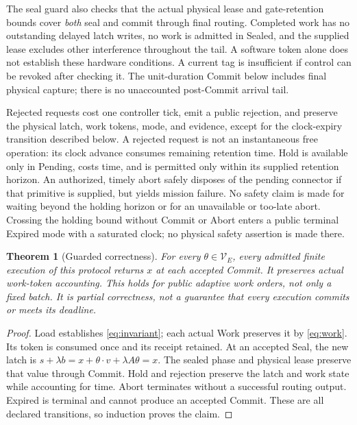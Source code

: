 \documentclass[11pt,a4paper]{article}
\newtheorem{theorem}{Theorem}[section]
\theoremstyle{definition}
\newcommand{\V}{\mathcal V}
\begin{document}
The seal guard also checks that the actual physical lease and gate-retention
bounds cover \emph{both} seal and commit through final routing. Completed
work has no outstanding delayed latch writes, no work is admitted in Sealed,
and the supplied lease excludes other interference throughout the tail.
A software token alone does not establish these hardware conditions. A
current tag is insufficient if control can be revoked after checking it.
The unit-duration Commit below includes final physical capture; there is no
unaccounted post-Commit arrival tail.

Rejected requests cost one controller tick, emit a public rejection, and
preserve the physical latch, work tokens, mode, and evidence, except for
the clock-expiry transition described below. A rejected
request is not an instantaneous free operation: its clock advance consumes
remaining retention time. Hold is available only in Pending, costs time,
and is permitted only within its supplied retention horizon. An authorized, timely abort safely disposes of
the pending connector if that primitive is supplied, but yields mission
failure. No safety claim is made for waiting beyond the holding horizon or
for an unavailable or too-late abort. Crossing the holding bound without
Commit or Abort enters a public terminal Expired mode with a saturated
clock; no physical safety assertion is made there.

\begin{theorem}[Guarded correctness]\label{thm:production}
For every $\theta\in\V_E$, every admitted finite execution of this protocol
returns $x$ at each accepted Commit. It preserves actual work-token
accounting. This holds for public adaptive work orders, not only a fixed
batch. It is partial correctness, not a guarantee that every execution
commits or meets its deadline.
\end{theorem}
\begin{proof}
Load establishes \eqref{eq:invariant}; each actual Work preserves it by
\eqref{eq:work}. Its token is consumed once and its receipt retained.
At an accepted Seal, the new latch is
$s+\lambda b=x+\theta\cdot v+\lambda A\theta=x$.
The sealed phase and physical lease preserve that value through Commit.
Hold and rejection preserve the latch and work state while accounting for
time. Abort terminates without a successful routing output. Expired is terminal and cannot produce an accepted Commit. These are all
declared transitions, so induction proves the claim.
\end{proof}
\end{document}

